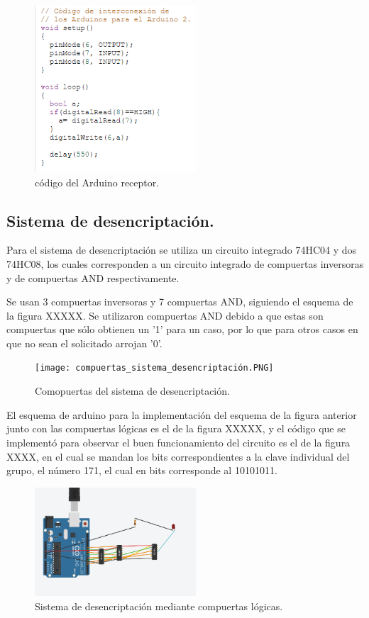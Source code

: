 \documentclass{article}
\begin{document}
\begin{figure}[h]
\includegraphics[width=6cm]{codigo_arduino2.PNG}
\centering
\caption{código del Arduino receptor.}
\label{fig:codigo_arduino2.PNG}
\end{figure}

\newpage
\subsection{Sistema de desencriptación.}

Para el sistema de desencriptación se utiliza un circuito integrado 74HC04 y dos 74HC08, los cuales corresponden a un circuito integrado de compuertas inversoras y de compuertas AND respectivamente.

Se usan 3 compuertas inversoras y 7 compuertas AND, siguiendo el esquema de la figura XXXXX. Se utilizaron compuertas AND debido a que estas son compuertas que sólo obtienen un '1' para un caso, por lo que para otros casos en que no sean el solicitado arrojan '0'.


\begin{figure}[h]
\texttt{[image: compuertas\_sistema\_desencriptación.PNG]}
\centering
\caption{Comopuertas del sistema de desencriptación.}
\label{fig:compuertas_sistema_desencriptación.PNG}
\end{figure}

El esquema de arduino para la implementación del esquema de la figura anterior junto con las compuertas lógicas es el de la figura XXXXX, y el código que se implementó para observar el buen funcionamiento del circuito es el de la figura XXXX, en el cual se mandan los bits correspondientes a la clave individual del grupo, el número 171, el cual en bits corresponde al 10101011.


\begin{figure}[h]
\includegraphics[width=6cm]{sistema_desencriptacion.PNG}
\centering
\caption{Sistema de desencriptación mediante compuertas lógicas.}
\label{fig:sistema_desencriptacion.PNG}
\end{figure}
\end{document}
